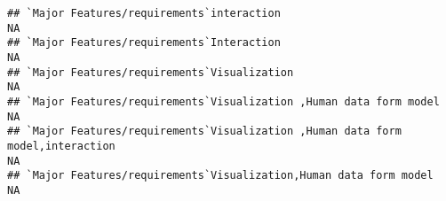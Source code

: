 \documentclass[]{article}
\begin{document}
\begin{verbatim}
## `Major Features/requirements`interaction                                                                                                                                                                                                                                                                                                                                                                                                                                             NA
## `Major Features/requirements`Interaction                                                                                                                                                                                                                                                                                                                                                                                                                                             NA
## `Major Features/requirements`Visualization                                                                                                                                                                                                                                                                                                                                                                                                                                           NA
## `Major Features/requirements`Visualization ,Human data form model                                                                                                                                                                                                                                                                                                                                                                                                                    NA
## `Major Features/requirements`Visualization ,Human data form model,interaction                                                                                                                                                                                                                                                                                                                                                                                                        NA
## `Major Features/requirements`Visualization,Human data form model                                                                                                                                                                                                                                                                                                                                                                                                                     NA

\end{verbatim}
\end{document}
